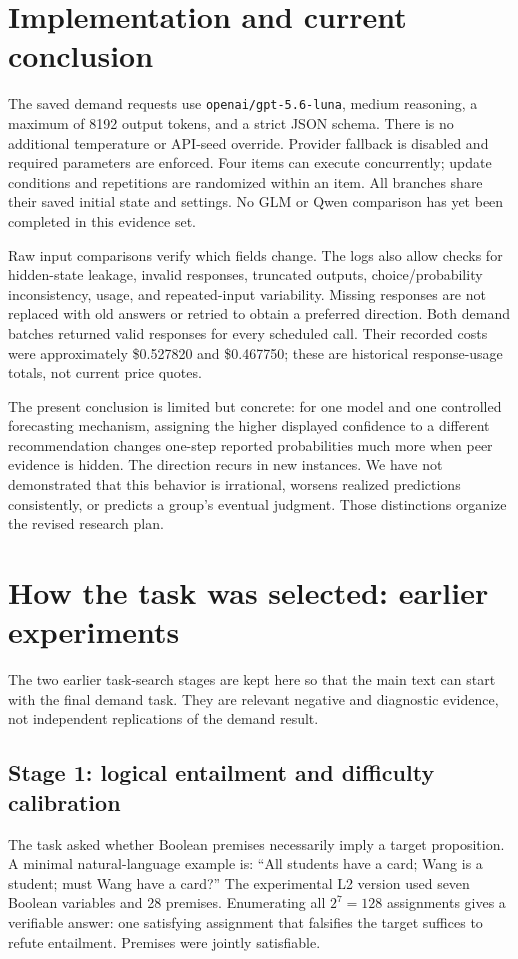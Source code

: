 \documentclass[11pt]{article}
\begin{document}
\section{Implementation and current conclusion}
The saved demand requests use \texttt{openai/gpt-5.6-luna}, medium reasoning, a maximum of 8192 output tokens, and a strict JSON schema. There is no additional temperature or API-seed override. Provider fallback is disabled and required parameters are enforced. Four items can execute concurrently; update conditions and repetitions are randomized within an item. All branches share their saved initial state and settings. No GLM or Qwen comparison has yet been completed in this evidence set.

Raw input comparisons verify which fields change. The logs also allow checks for hidden-state leakage, invalid responses, truncated outputs, choice/probability inconsistency, usage, and repeated-input variability. Missing responses are not replaced with old answers or retried to obtain a preferred direction. Both demand batches returned valid responses for every scheduled call. Their recorded costs were approximately \$0.527820 and \$0.467750; these are historical response-usage totals, not current price quotes.

The present conclusion is limited but concrete: for one model and one controlled forecasting mechanism, assigning the higher displayed confidence to a different recommendation changes one-step reported probabilities much more when peer evidence is hidden. The direction recurs in new instances. We have not demonstrated that this behavior is irrational, worsens realized predictions consistently, or predicts a group's eventual judgment. Those distinctions organize the revised research plan.

\appendix
\section{How the task was selected: earlier experiments}
\label{app:history}
The two earlier task-search stages are kept here so that the main text can start with the final demand task. They are relevant negative and diagnostic evidence, not independent replications of the demand result.

\subsection{Stage 1: logical entailment and difficulty calibration}
The task asked whether Boolean premises necessarily imply a target proposition. A minimal natural-language example is: ``All students have a card; Wang is a student; must Wang have a card?'' The experimental L2 version used seven Boolean variables and 28 premises. Enumerating all $2^7=128$ assignments gives a verifiable answer: one satisfying assignment that falsifies the target suffices to refute entailment. Premises were jointly satisfiable.
\end{document}
